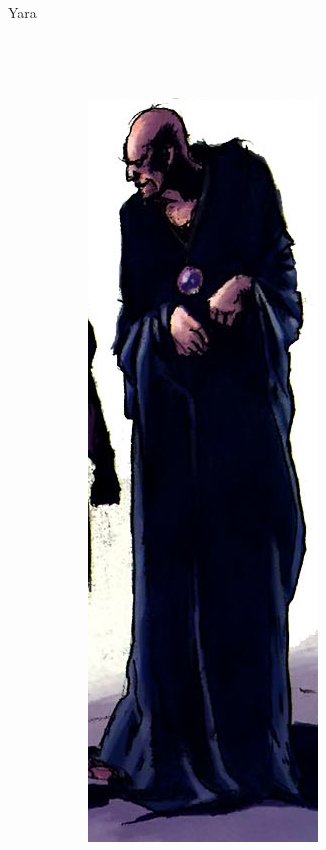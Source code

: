 \begin{frame}{Yara}
\begin{columns}
\begin{figure}[htp]
\begin{subfigure}[b]{0.25\textwidth}
 \end{subfigure}
~
 \begin{subfigure}[b]{0.2\textwidth}
   \includegraphics[width=\textwidth]{img/yara/DH}

\end{subfigure}
\end{figure}
\end{columns}
\end{frame}
